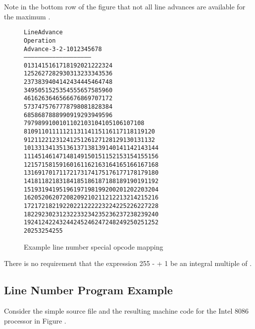 Note in the bottom row of the figure that not all line advances are 
available for the maximum .

\begin{figure}[ht]
\begin{alltt}
                        Line Advance
   Operation  
     Advance    -3  -2  -1   0   1   2   3   4   5   6   7   8
   ---------   -----------------------------------------------
           0    13  14  15  16  17  18  19  20  21  22  23  24
           1    25  26  27  28  29  30  31  32  33  34  35  36
           2    37  38  39  40  41  42  43  44  45  46  47  48
           3    49  50  51  52  53  54  55  56  57  58  59  60
           4    61  62  63  64  65  66  67  68  69  70  71  72
           5    73  74  75  76  77  78  79  80  81  82  83  84
           6    85  86  87  88  89  90  91  92  93  94  95  96
           7    97  98  99 100 101 102 103 104 105 106 107 108
           8   109 110 111 112 113 114 115 116 117 118 119 120
           9   121 122 123 124 125 126 127 128 129 130 131 132
          10   133 134 135 136 137 138 139 140 141 142 143 144
          11   145 146 147 148 149 150 151 152 153 154 155 156
          12   157 158 159 160 161 162 163 164 165 166 167 168
          13   169 170 171 172 173 174 175 176 177 178 179 180
          14   181 182 183 184 185 186 187 188 189 190 191 192
          15   193 194 195 196 197 198 199 200 201 202 203 204
          16   205 206 207 208 209 210 211 212 213 214 215 216
          17   217 218 219 220 221 222 223 224 225 226 227 228 
          18   229 230 231 232 233 234 235 236 237 238 239 240 
          19   241 242 243 244 245 246 247 248 249 250 251 252
          20   253 254 255
          
\end{alltt}
\caption{Example line number special opcode mapping}
\label{fig:examplelinenumberspecialopcodemapping}
\end{figure}

There is no requirement that the expression 
255 -  + 1 be an integral multiple of
.


\clearpage
\subsection{Line Number Program Example}
\label{app:linenumberprogramexample}

Consider the simple source file and the resulting machine
code for the Intel 8086 processor in 
Figure .

